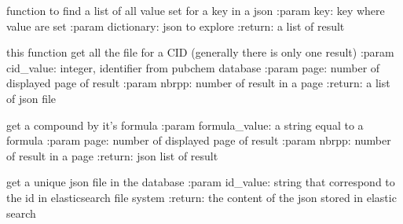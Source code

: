 \documentclass[letterpaper,10pt,english]{sphinxmanual}
\begin{document}
\begin{fulllineitems}
\label{\detokenize{QuChemPedIA:QuChemPedIA.search.find}}
function to find a list of all value set for a key in a json
:param key: key where value are set
:param dictionary: json to explore
:return: a list of result

\end{fulllineitems}


\begin{fulllineitems}
\label{\detokenize{QuChemPedIA:QuChemPedIA.search.search_cid}}
this function get all the file for a CID (generally there is only one result)
:param cid\_value: integer, identifier from pubchem database
:param page: number of displayed page of result
:param nbrpp: number of result in a page
:return: a list of json file

\end{fulllineitems}


\begin{fulllineitems}
\label{\detokenize{QuChemPedIA:QuChemPedIA.search.search_formula}}
get a compound by it’s formula
:param formula\_value: a string equal to a formula
:param page: number of displayed page of result
:param nbrpp: number of result in a page
:return: json list of result

\end{fulllineitems}


\begin{fulllineitems}
\label{\detokenize{QuChemPedIA:QuChemPedIA.search.search_id}}
get a unique json file in the database
:param id\_value: string that correspond to the id in elasticsearch file system
:return: the content of the json stored in elastic search

\end{fulllineitems}
\end{document}
